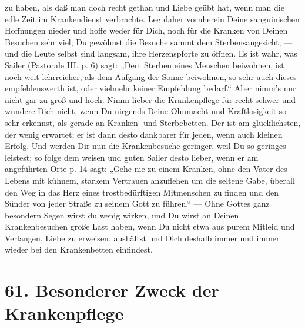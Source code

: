 zu haben, als daß man doch recht gethan und Liebe geübt hat, wenn man die edle Zeit im Krankendienst verbrachte. Leg daher vornherein Deine sanguinischen Hoffnungen nieder und hoffe weder für Dich, noch für die Kranken von Deinen Besuchen sehr viel; Du gewöhnst die Besuche sammt dem Sterbensangesicht, — und die Leute selbst sind langsam, ihre Herzenspforte zu öffnen. Es ist wahr, was Sailer (Pastorale III. p. 6) sagt: „Dem Sterben eines Menschen beiwohnen, ist noch weit lehrreicher, als dem Aufgang der Sonne beiwohnen, so sehr auch dieses empfehlenswerth ist, oder vielmehr keiner Empfehlung bedarf.“ Aber nimm’s nur nicht gar zu groß und hoch. Nimm lieber die Krankenpflege für recht schwer und wundere Dich nicht, wenn Du nirgends Deine Ohnmacht und Kraftlosigkeit so sehr erkennst, als gerade an Kranken- und Sterbebetten. Der ist am glücklichsten, der wenig erwartet; er ist dann desto dankbarer für jeden, wenn auch kleinen Erfolg. Und werden Dir nun die Krankenbesuche geringer, weil Du so geringes leistest; so folge dem weisen und guten Sailer desto lieber, wenn er am angeführten Orte p. 14 sagt: „Gehe nie zu einem Kranken, ohne den Vater des Lebens mit kühnem, starkem Vertrauen anzuflehen um die seltene Gabe, überall den Weg in das Herz eines trostbedürftigen Mitmenschen zu finden und den Sünder von jeder Straße zu seinem Gott zu führen.“ — Ohne Gottes ganz besondern Segen wirst du wenig wirken, und Du wirst an Deinen Krankenbesuchen große Last haben, wenn Du nicht etwa aus purem Mitleid und
Verlangen, Liebe zu erweisen, aushältst und Dich deshalb immer und immer wieder bei den Krankenbetten einfindest.

\section{61. Besonderer Zweck der Krankenpflege}

